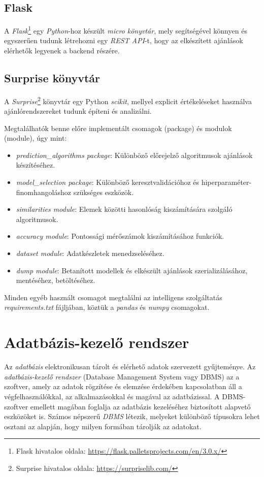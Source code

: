 \documentclass[
]{thesis-ekf}
\theoremstyle{definition}
\theoremstyle{remark}
\begin{document}
\subsection{Flask}
A \emph{Flask}\footnote{Flask hivatalos oldala: \url{https://flask.palletsprojects.com/en/3.0.x/}} egy \emph{Python}-hoz készült \emph{micro könyvtár}\cite{wiki-flask}, mely segítségével könnyen és egyszerűen tudunk létrehozni egy \emph{REST API}-t, hogy az elkészített ajánlások elérhetők legyenek a backend részére.

\subsection{Surprise könyvtár}
\label{subsec-surpriselib}
A \emph{Surprise}\footnote{Surprise hivatalos oldala: \url{https://surpriselib.com/}} könyvtár egy Python \emph{scikit}, mellyel  explicit értékeléseket használva ajánlórendszereket tudunk építeni és analizálni.\cite{surpriselib}

Megtalálhatók benne előre implementált csomagok (package) és modulok (module), úgy mint: 
\begin{itemize}
	\item \emph{prediction\_algorithms package}: Különböző előrejelző algoritmusok ajánlások készítéséhez.
	\item \emph{model\_selection package}: Különböző keresztvalidációhoz és hiperparaméter-\\finomhangoláshoz szükséges eszközök.
	\item \emph{similarities module}: Elemek közötti hasonlóság kiszámítására szolgáló algoritmusok.
	\item \emph{accuracy module}: Pontossági mérőszámok kiszámításához funkciók.
	\item \emph{dataset module}: Adatkészletek menedzseléséhez.
	\item \emph{dump module}: Betanított modellek és elkészült ajánlások szerializálásához, mentéséhez, betöltéséhez.
\end{itemize}\cite{surpriselib}

Minden egyéb használt csomagot megtalálni az intelligens szolgáltatás \emph{requirements.txt} fájljában, köztük a \emph{pandas} és \emph{numpy} csomagokat.

\section{Adatbázis-kezelő rendszer}
Az \emph{adatbázis} elektronikusan tárolt és elérhető adatok szervezett gyűjteménye. Az \emph{adatbázis-kezelő rendszer} (Database Management System vagy DBMS) az a szoftver, amely az adatok rögzítése és elemzése érdekében kapcsolatban áll a végfelhasználókkal, az alkalmazásokkal és magával az adatbázissal. A DBMS-szoftver emellett magában foglalja az adatbázis kezeléséhez biztosított alapvető eszközöket is. Számos népszerű \emph{DBMS} létezik, melyeket különböző típusokra lehet osztani az alapján, hogy milyen formában tárolják az adatokat.\cite{wiki-adatbazis}
\end{document}
